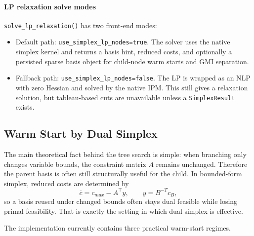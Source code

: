 \paragraph{LP relaxation solve modes}
\texttt{solve\_lp\_relaxation()} has two front-end modes:
\begin{itemize}
  \item Default path: \texttt{use\_simplex\_lp\_nodes=true}. The solver uses the native simplex kernel and returns a basis hint, reduced costs, and optionally a persisted sparse basis object for child-node warm starts and GMI separation.
  \item Fallback path: \texttt{use\_simplex\_lp\_nodes=false}. The LP is wrapped as an NLP with zero Hessian and solved by the native IPM. This still gives a relaxation solution, but tableau-based cuts are unavailable unless a \texttt{SimplexResult} exists.
\end{itemize}

\subsection{Warm Start by Dual Simplex}

The main theoretical fact behind the tree search is simple: when branching only changes variable bounds, the constraint matrix \(A\) remains unchanged. Therefore the parent basis is often still structurally useful for the child. In bounded-form simplex, reduced costs are determined by
\begin{equation}
  \bar c = c_{max} - A^\top y, \qquad y = B^{-T} c_B,
\end{equation}
so a basis reused under changed bounds often stays dual feasible while losing primal feasibility. That is exactly the setting in which dual simplex is effective.

The implementation currently contains three practical warm-start regimes.

